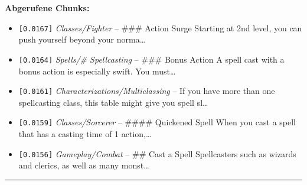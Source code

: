 \noindent\textbf{Abgerufene Chunks:}
\begin{itemize}[noitemsep, topsep=2pt]
  \item[\textbf{\#1}] \texttt{[0.0167]} \textit{Classes/Fighter} -- \#\#\# Action Surge  Starting at 2nd level, you can push yourself beyond your norma\ldots
  \item[\textbf{\#2}] \texttt{[0.0164]} \textit{Spells/# Spellcasting} -- \#\#\# Bonus Action  A spell cast with a bonus action is especially swift. You must\ldots
  \item[\textbf{\#3}] \texttt{[0.0161]} \textit{Characterizations/Multiclassing} -- If you have more than one spellcasting class, this table might give you spell sl\ldots
  \item[\textbf{\#4}] \texttt{[0.0159]} \textit{Classes/Sorcerer} -- \#\#\#\# Quickened Spell  When you cast a spell that has a casting time of 1 action,\ldots
  \item[\textbf{\#5}] \texttt{[0.0156]} \textit{Gameplay/Combat} -- \#\# Cast a Spell  Spellcasters such as wizards and clerics, as well as many monst\ldots
\end{itemize}
\vspace{4pt}
\hrule
\vspace{6pt}
